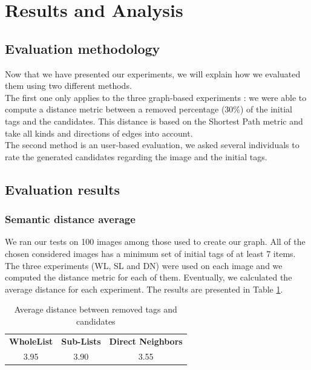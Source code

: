 \section{Results and Analysis} %
\label{sec:results_and_analysis}
\subsection{Evaluation methodology} %
\label{sub:evaluation_methodology}
Now that we have presented our experiments, we will explain how we evaluated them using two different methods.\\

The first one only applies to the three graph-based experiments : we were able to compute a distance metric between a removed percentage (30\%) of the initial tags and the candidates. This distance is based on the Shortest Path metric and take all kinds and directions of edges into account.\\

The second method is an user-based evaluation, we asked several individuals to rate the generated candidates regarding the image and the initial tags.\\


\subsection{Evaluation results} %
\label{sub:evaluation_results}
\subsubsection{Semantic distance average} %
\label{ssub:semantic_distance_average}
We ran our tests on 100 images among those used to create our graph. All of the chosen considered images has a minimum set of initial tags of at least 7 items. The three experiments (WL, SL and DN) were used on each image and we computed the distance metric for each of them. Eventually, we calculated the average distance for each experiment. The results are presented in Table \ref{table:avgDist}.\\
\begin{table}[!h]
\centering
\begin{tabular}{ccc}
\cline{1-3}
\multicolumn{1}{|c|}{{\bf WholeList}} & \multicolumn{1}{c|}{{\bf Sub-Lists}} & \multicolumn{1}{c|}{{\bf Direct Neighbors}} \\ \cline{1-3}
\multicolumn{1}{|c|}{3.95}     & \multicolumn{1}{c|}{3.90}     & \multicolumn{1}{c|}{3.55} \\ \cline{1-3}
\end{tabular}
\caption{Average distance between removed tags and candidates}
\label{table:avgDist}
\end{table}

